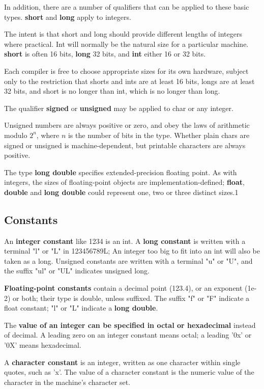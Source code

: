 \documentclass{article}
\begin{document}
In addition, there are a number of qualifiers that can be applied to these basic types. \textbf{short} and \textbf{long} apply to integers.

The intent is that short and long should provide different lengths of integers where practical. Int will normally be the natural size for a particular machine. \textbf{short} is often 16 bits, \textbf{long} 32 bits, and \textbf{int} either 16 or 32 bits.

Each compiler is free to choose appropriate sizes for its own hardware, subject only to the restriction that shorts and ints are at least 16 bits, longs are at least 32 bits, and short is no longer than int, which is no longer than long.

The qualifier \textbf{signed} or \textbf{unsigned} may be applied to char or any integer.

Unsigned numbers are always positive or zero, and obey the laws of arithmetic modulo $2^n$, where $n$ is the number of bits in the type. Whether plain chars are signed or unsigned is machine-dependent, but printable characters are always positive.

The type \textbf{long double} specifies extended-precision floating point. As with integers, the sizes of floating-point objects are implementation-defined; \textbf{float}, \textbf{double} and \textbf{long double} could represent one, two or three distinct sizes.1

\clearpage
\subsection{Constants}

An \textbf{integer constant} like 1234 is an int. 
A \textbf{long constant} is written with a terminal "l" or "L" in 123456789L; An integer too big to fit into an int will also be taken as a long. Unsigned constants are written with a terminal "u" or "U", and the suffix "ul" or "UL" indicates unsigned long.

\textbf{Floating-point constants} contain a decimal point (123.4), or an exponent (1e-2) or both; their type is double, unless suffixed. The suffix "f" or "F" indicate a float constant; "l" or "L" indicate a \textbf{long double}.

The \textbf{value of an integer can be specified in octal or hexadecimal} instead of decimal. A leading zero on an integer constant means octal; a leading '0x' or '0X' means hexadecimal.

A \textbf{character constant} is an integer, written as one character within single quotes, such as 'x'. The value of a character constant is the numeric value of the character in the machine's character set.
\end{document}
